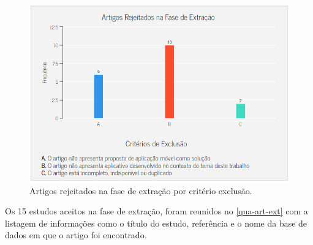 \begin{figure}[htb]
	\caption{\label{fig_art_rej_fas_ext}Artigos rejeitados na fase de extração por critério exclusão.}
	\begin{center}
	    \includegraphics[scale=0.7]{Imagens/msl/artigos_rejeitados_fase_extracao.png}
	\end{center}
\end{figure}

\newpage

Os 15 estudos aceitos na fase de extração, foram reunidos no \autoref{qua-art-ext} com a listagem de informações como o título do estudo, referência e o nome da base de dados em que o artigo foi encontrado.


